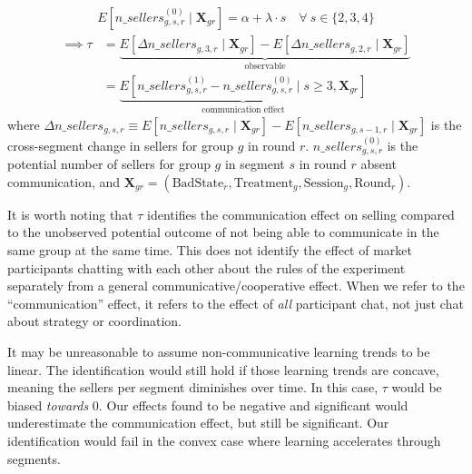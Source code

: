 \documentclass[thesis]{uathesis}
\begin{document}
\begin{body}
\begin{equation}
  \begin{split}
E[n\_sellers_{g,s,r}^{(0)} \mid \mathbf{X}_{gr}] = \alpha + \lambda \cdot s \quad \forall \ s \in \{2,3,4\}
  \end{split}
  \end{equation}
  \begin{equation}
  \begin{split}
      \implies \tau &= \underbrace{E[\Delta n\_sellers_{g,3,r} \mid \mathbf{X}_{gr}] - E[\Delta n\_sellers_{g,2,r} \mid \mathbf{X}_{gr}]}_{\text{observable}} \\
      &= \underbrace{E[n\_sellers_{g,s,r}^{(1)} - n\_sellers_{g,s,r}^{(0)} \mid s \geq 3, \mathbf{X}_{gr}]}_{\text{communication effect}}
  \end{split}
  \end{equation}
where $\Delta n\_sellers_{g,s,r} \equiv E[n\_sellers_{g,s,r} \mid \mathbf{X}_{gr}] - E[n\_sellers_{g,s-1,r} \mid \mathbf{X}_{gr}]$ is the cross-segment change in sellers for group $g$ in round $r$. $n\_sellers_{g,s,r}^{(0)}$ is the potential number of sellers for group $g$ in segment $s$ in round $r$ absent communication, and $\mathbf{X}_{gr} = (\text{BadState}_r, \text{Treatment}_g, \text{Session}_g, \text{Round}_r)$.


It is worth noting that $\tau$ identifies the communication effect on selling compared to the unobserved potential outcome of not being able to communicate in the same group at the same time. This does not identify the effect of market participants chatting with each other about the rules of the experiment separately from a general communicative/cooperative effect. When we refer to the ``communication'' effect, it refers to the effect of \textit{all} participant chat, not just chat about strategy or coordination.

It may be unreasonable to assume non-communicative learning trends to be linear. The identification would still hold if those learning trends are concave, meaning the sellers per segment diminishes over time. In this case, $\tau$ would be biased \textit{towards} 0. Our effects found to be negative and significant would underestimate the communication effect, but still be significant. Our identification would fail in the convex case where learning accelerates through segments.



\end{body}
\end{document}
